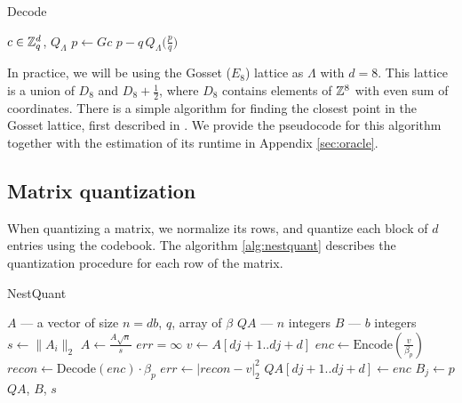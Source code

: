 \begin{algorithm}[h]
\caption{Decode}
\label{decode-algo}
\begin{algorithmic}
    $c \in \mathbb{Z}_q^d$, $Q_{\Lambda}$
   \State $p \leftarrow Gc$ 
    $p - q\,Q_{\Lambda}\!\bigl(\tfrac{p}{q}\bigr)$
\end{algorithmic}
\end{algorithm}

In practice, we will be using the Gosset ($E_8$) lattice as $\Lambda$ with $d = 8$. This lattice is a union of $D_8$ and $D_8 + \frac{1}{2}$, where $D_8$ contains elements of $\mathbb{Z}^8$ with even sum of coordinates. There is a simple algorithm for finding the closest point in the Gosset lattice, first described in \cite{1056484}. We provide the pseudocode for this algorithm together with the estimation of its runtime in Appendix \ref{sec:oracle}.

\subsection{Matrix quantization}

\label{matrix-quant}

When quantizing a matrix, we normalize its rows, and quantize each block of $d$ entries using the codebook. The algorithm \ref{alg:nestquant} describes the quantization procedure for each row of the matrix.

\begin{algorithm}[h]
\caption{NestQuant}
\label{alg:nestquant}
\begin{algorithmic}
    $A$ --- a vector of size $n = db$, $q$, array of $\beta$
   \State $QA$ --- $n$ integers 
   \State $B$ --- $b$ integers 
   \State \label{norm_nestquant} $s \leftarrow \lVert A_i\rVert_2$ 
   \State $A \leftarrow \frac{A\sqrt{n}}{s}$
        \State $err = \infty$
            \State $v \leftarrow A[dj+1..dj+d]$
            \State $enc \leftarrow \text{Encode}\left(\frac{v}{\beta_p}\right)$
            \State $recon \leftarrow \text{Decode}(enc) \cdot \beta_p$
                \State $err \leftarrow |recon - v|_2^2$
                \State $QA[dj+1..dj+d] \leftarrow enc$
                \State $B_{j} \leftarrow p$
            \EndIf
        \EndFor
   \EndFor
    $QA$, $B$, $s$
\end{algorithmic}
\end{algorithm}

